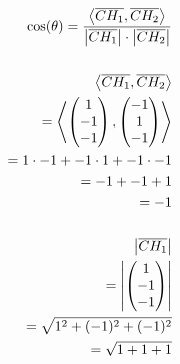 \begin{align*}
    \cos(\theta) = \frac{\left\langle \overline{CH_1}, \overline{CH_2} \right\rangle}{\left|\overline{CH_1}\right| \cdot \left|\overline{CH_2}\right|} \\\\
    \left\langle \overline{CH_1}, \overline{CH_2} \right\rangle                                                                                        \\
    = \left\langle \begin{pmatrix}
                       1 \\ -1 \\ -1
                   \end{pmatrix}, \begin{pmatrix}
                                      -1 \\ 1 \\ -1
                                  \end{pmatrix} \right\rangle                                                                                          \\
    = 1 \cdot -1 + -1 \cdot 1 + -1 \cdot -1                                                                                                            \\
    = -1 + -1 + 1                                                                                                                                      \\
    = -1                                                                                                                                               \\\\ \pagebreak[2]
    \left|\overline{CH_1}\right|                                                                                                                       \\
    = \left|\begin{pmatrix}
                1 \\ -1 \\ -1
            \end{pmatrix}\right|                                                                                                                       \\
    = \sqrt{1^2 + (-1)^2 + (-1)^2}                                                                                                                     \\
    = \sqrt{1 + 1 + 1}                                                                                                                                 \\

\end{align*}
